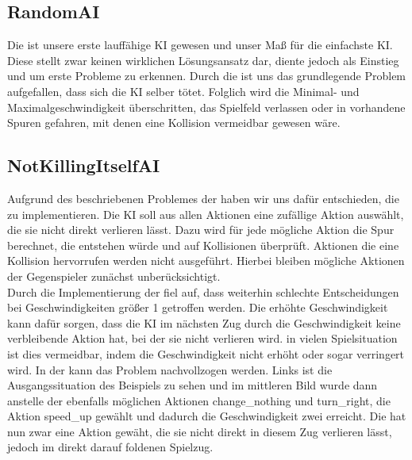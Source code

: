\subsection{RandomAI}
\label{subsec:random-ai}

Die  ist unsere erste lauffähige KI gewesen und unser Maß für die einfachste \ac{KI}.
Diese stellt zwar keinen wirklichen Lösungsansatz dar, diente jedoch als Einstieg und um erste Probleme zu erkennen.
Durch die  ist uns das grundlegende Problem aufgefallen, dass sich die \ac{KI} selber tötet.
Folglich wird die Minimal- und Maximalgeschwindigkeit überschritten, das Spielfeld verlassen oder in vorhandene Spuren
gefahren, mit denen eine Kollision vermeidbar gewesen wäre.

\subsection{NotKillingItselfAI}
\label{subsec:notkillingitself-ai}

Aufgrund des beschriebenen Problemes der  haben wir uns dafür entschieden, die 
zu implementieren.
Die \ac{KI} soll aus allen Aktionen eine zufällige Aktion auswählt, die sie nicht direkt verlieren lässt.
Dazu wird für jede mögliche Aktion die Spur berechnet, die entstehen würde und auf Kollisionen überprüft.
Aktionen die eine Kollision hervorrufen werden nicht ausgeführt.
Hierbei bleiben mögliche Aktionen der Gegenspieler zunächst unberücksichtigt. \\

Durch die Implementierung der  fiel auf, dass weiterhin schlechte Entscheidungen bei
Geschwindigkeiten größer 1 getroffen werden.
Die erhöhte Geschwindigkeit kann dafür sorgen, dass die \ac{KI} im nächsten Zug durch die Geschwindigkeit keine
verbleibende Aktion hat, bei der sie nicht verlieren wird.
in vielen Spielsituation ist dies vermeidbar, indem die Geschwindigkeit nicht erhöht oder sogar verringert wird.
In der  kann das Problem nachvollzogen werden.
Links ist die Ausgangssituation des Beispiels zu sehen und im mittleren Bild wurde dann anstelle der ebenfalls möglichen
Aktionen change\_nothing und turn\_right, die Aktion speed\_up gewählt und dadurch die Geschwindigkeit zwei erreicht.
Die  hat nun zwar eine Aktion gewäht, die sie nicht direkt in diesem Zug verlieren lässt,
jedoch im direkt darauf foldenen Spielzug.

